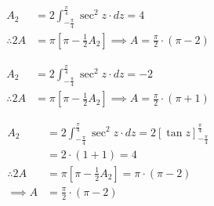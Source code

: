 \documentclass[14pt,fleqn]{extarticle}
\begin{document}
\newcard 

\begin{align}
A_2 &= 2\int_{-\frac\pi{4}}^{\frac\pi{4}}\sec^2 z\cdot dz = 4\\
\therefore 2A &= \pi\left[ \pi-\frac{1}{2}A_2 \right] \implies 
A = \frac\pi{2}\cdot(\pi-2) 
\end{align}

\newcard 

\begin{align}
A_2 &= 2\int_{-\frac\pi{4}}^{\frac\pi{4}}\sec^2 z\cdot dz = -2\\
\therefore 2A &= \pi\left[ \pi-\frac{1}{2}A_2 \right] \implies 
A = \frac\pi{2}\cdot(\pi+ 1) 
\end{align}

\newcard 

\begin{align}
A_2 &= 2\int_{-\frac\pi{4}}^{\frac\pi{4}}\sec^2 z\cdot dz = 2\left[\tan z \right]_{-\frac\pi{4}}^{\frac\pi{4}}\\
&= 2\cdot (1 + 1) = 4 \\
\therefore 2A &= \pi\left[ \pi-\frac{1}{2}A_2 \right] = \pi\cdot(\pi - 2)\\
\implies A &= \frac\pi{2}\cdot(\pi-2) 
\end{align}
\end{document}
